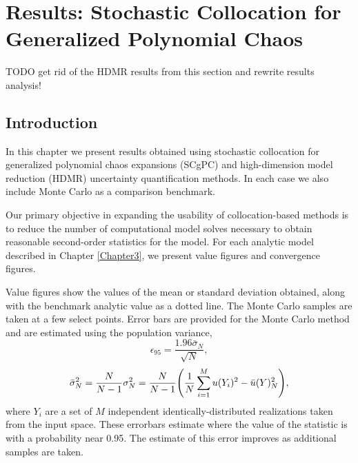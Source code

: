 
\chapter{Results: Stochastic Collocation for Generalized Polynomial Chaos} %

\label{ch:results scgpc} %



TODO get rid of the HDMR results from this section and rewrite results analysis!
\section{Introduction}
In this chapter we present results obtained using stochastic collocation for generalized polynomial chaos
expansions (SCgPC) and high-dimension model reduction (HDMR) uncertainty quantification methods.  In each case
we also include Monte Carlo as a comparison benchmark.

Our primary objective in expanding the usability of collocation-based methods is to reduce the number of
computational model solves necessary to obtain reasonable second-order statistics for the model.  For each
analytic model described in Chapter \ref{Chapter3}, we present value figures and convergence figures.  

Value figures show the values of the mean or standard deviation obtained, along with the benchmark analytic
value as a dotted line.  The Monte Carlo samples are taken at a few select points.  Error bars are provided
for the Monte Carlo method and are estimated using the population variance,
\begin{equation}
  \epsilon_{95} = \frac{1.96\bar\sigma_N}{\sqrt{N}},
\end{equation}
\begin{equation}
  \bar\sigma_N^2 = \frac{N}{N-1}\sigma^2_N = \frac{N}{N-1}\qty(\frac{1}{N}\sum_{i=1}^M u(Y_i)^2 - \bar
  u(Y)^2_N),
\end{equation}
where $Y_i$ are a set of $M$ independent identically-distributed realizations taken from the input space.
These errorbars estimate where the value of the statistic is with a probability near 0.95.  The estimate of
this error improves as additional samples are taken.


